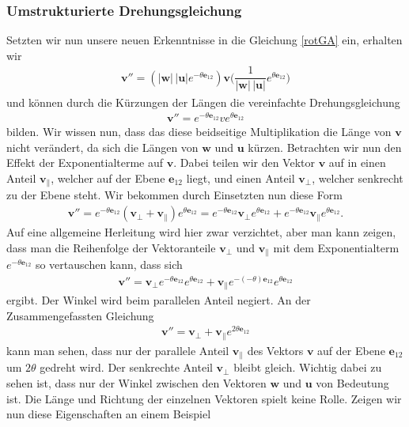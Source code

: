 \subsubsection{Umstrukturierte Drehungsgleichung}
Setzten wir nun unsere neuen Erkenntnisse in die Gleichung \eqref{rotGA} ein, erhalten wir
\begin{align}
\mathbf{v''} = (|\mathbf{w}|\,|\mathbf{u}|e^{-\theta \mathbf{e}_{12}})\mathbf{v}\biggl(\dfrac{1}{|\mathbf{w}|\,|\mathbf{u}|}e^{\theta \mathbf{e}_{12}}\biggr)
\end{align}
und können durch die Kürzungen der Längen die vereinfachte Drehungsgleichung
\begin{align} \label{GAvereinfRot}
\mathbf{v''} = e^{-\theta \mathbf{e}_{12}} v e^{\theta \mathbf{e}_{12}}
\end{align}
bilden. Wir wissen nun, dass das diese beidseitige Multiplikation die Länge von $\mathbf{v}$ nicht verändert, da sich die Längen von $\mathbf{w}$ und $\mathbf{u}$ kürzen. Betrachten wir nun den Effekt der Exponentialterme auf $\mathbf{v}$. Dabei teilen wir den Vektor $\mathbf{v}$ auf in einen Anteil $\mathbf{v_\parallel}$, welcher auf der Ebene $\mathbf{e}_{12}$ liegt, und einen Anteil $\mathbf{v_\perp}$, welcher senkrecht zu der Ebene steht. Wir bekommen durch Einsetzten nun diese Form
\begin{align} \label{RotAufPerpPar}
\mathbf{v}'' = e^{-\theta \mathbf{e}_{12}} (\mathbf{v_\perp + v_\parallel}) e^{\theta \mathbf{e}_{12}} = e^{-\theta \mathbf{e}_{12}} \mathbf{v_\perp} e^{\theta \mathbf{e}_{12}} + e^{-\theta \mathbf{e}_{12}} \mathbf{v_\parallel} e^{\theta \mathbf{e}_{12}}.
\end{align}
Auf eine allgemeine Herleitung wird hier zwar verzichtet, aber man kann zeigen, dass man die Reihenfolge der Vektoranteile $\mathbf{v_\perp}$ und $\mathbf{v_\parallel}$ mit dem Exponentialterm $e^{-\theta \mathbf{e}_{12}}$ so vertauschen kann, dass sich 
\begin{align}
\mathbf{v}'' = \mathbf{v_\perp} e^{-\theta \mathbf{e}_{12}}  e^{\theta \mathbf{e}_{12}} +  \mathbf{v_\parallel} e^{-(-\theta) \mathbf{e}_{12}} e^{\theta \mathbf{e}_{12}}
\end{align}
ergibt. Der Winkel wird beim parallelen Anteil negiert. An der Zusammengefassten Gleichung
\begin{align}\label{RotParPerp}
\mathbf{v}'' = \mathbf{v_\perp} +  \mathbf{v_\parallel} e^{2\theta \mathbf{e}_{12}}
\end{align}
kann man sehen, dass nur der parallele Anteil $\mathbf{v_\parallel}$ des Vektors $\mathbf{v}$ auf der Ebene $\mathbf{e}_{12}$ um $2\theta$ gedreht wird. Der senkrechte Anteil $\mathbf{v_\perp}$ bleibt gleich. Wichtig dabei zu sehen ist, dass nur der Winkel zwischen den Vektoren $\mathbf{w}$ und $\mathbf{u}$ von Bedeutung ist. Die Länge und Richtung der einzelnen Vektoren spielt keine Rolle. Zeigen wir nun diese Eigenschaften an einem Beispiel
